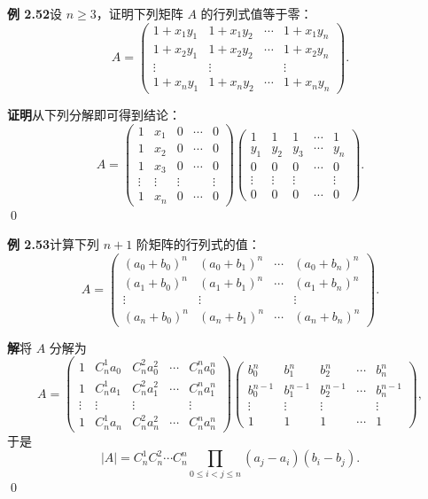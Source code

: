 \documentclass[UTF8,12pt,a4paper,fontset=fandol]{ctexart}
\begin{document}
\noindent\textbf{例 2.52}\quad 设 $n\ge3$，证明下列矩阵 $A$ 的行列式值等于零：
\[
A=
\left(
\begin{array}{cccc}
1+x_1y_1 & 1+x_1y_2 & \cdots & 1+x_1y_n\\
1+x_2y_1 & 1+x_2y_2 & \cdots & 1+x_2y_n\\
\vdots & \vdots & & \vdots\\
1+x_ny_1 & 1+x_ny_2 & \cdots & 1+x_ny_n
\end{array}
\right).
\]

\noindent\textbf{证明}\quad 从下列分解即可得到结论：
\[
A=
\left(
\begin{array}{ccccc}
1 & x_1 & 0 & \cdots & 0\\
1 & x_2 & 0 & \cdots & 0\\
1 & x_3 & 0 & \cdots & 0\\
\vdots & \vdots & \vdots & & \vdots\\
1 & x_n & 0 & \cdots & 0
\end{array}
\right)
\left(
\begin{array}{ccccc}
1 & 1 & 1 & \cdots & 1\\
y_1 & y_2 & y_3 & \cdots & y_n\\
0 & 0 & 0 & \cdots & 0\\
\vdots & \vdots & \vdots & & \vdots\\
0 & 0 & 0 & \cdots & 0
\end{array}
\right).
\]
\qed

\noindent\textbf{例 2.53}\quad 计算下列 $n+1$ 阶矩阵的行列式的值：
\[
A=
\left(
\begin{array}{cccc}
(a_0+b_0)^n & (a_0+b_1)^n & \cdots & (a_0+b_n)^n\\
(a_1+b_0)^n & (a_1+b_1)^n & \cdots & (a_1+b_n)^n\\
\vdots & \vdots & & \vdots\\
(a_n+b_0)^n & (a_n+b_1)^n & \cdots & (a_n+b_n)^n
\end{array}
\right).
\]

\noindent\textbf{解}\quad 将 $A$ 分解为
\[
A=
\left(
\begin{array}{ccccc}
1 & C_n^1a_0 & C_n^2a_0^2 & \cdots & C_n^na_0^n\\
1 & C_n^1a_1 & C_n^2a_1^2 & \cdots & C_n^na_1^n\\
\vdots & \vdots & \vdots & & \vdots\\
1 & C_n^1a_n & C_n^2a_n^2 & \cdots & C_n^na_n^n
\end{array}
\right)
\left(
\begin{array}{ccccc}
b_0^n & b_1^n & b_2^n & \cdots & b_n^n\\
b_0^{n-1} & b_1^{n-1} & b_2^{n-1} & \cdots & b_n^{n-1}\\
\vdots & \vdots & \vdots & & \vdots\\
1 & 1 & 1 & \cdots & 1
\end{array}
\right),
\]
于是
\[
|A|=C_n^1C_n^2\cdots C_n^n
\prod_{0\le i<j\le n}(a_j-a_i)(b_i-b_j).
\]
\qed
\end{document}
